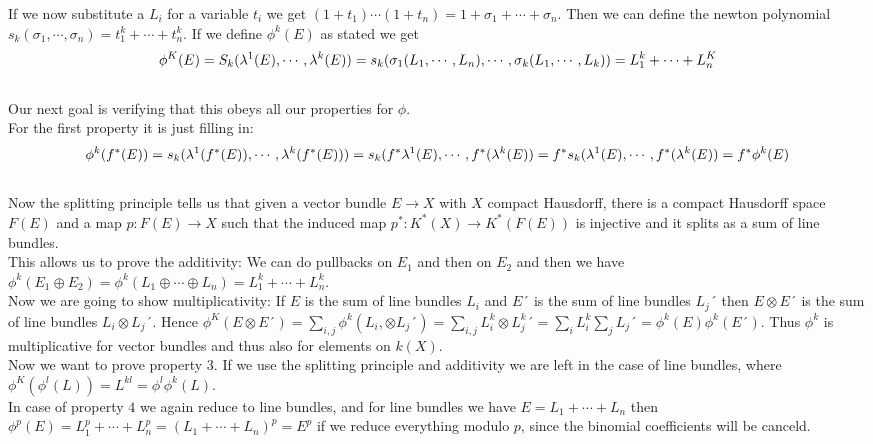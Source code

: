 \documentclass[../Thesis.tex]{subfiles}
\begin{document}
\begin{myproof}
If we now substitute a $L_i$ for a variable $t_i$ we get $(1 + t_1) \cdots ( 1 + t_n) = 1 + \sigma_1 + \cdots + \sigma_n$. Then we can define the newton polynomial $s_k(\sigma_1, \cdots, \sigma_n) = t_1^k + \cdots + t_n^k$. If we define $\phi^k(E)$ as stated we get
\begin{equation}
\phi^K(E) = S_k(\lambda^1(E), \cdots, \lambda^k(E)) \\
          = s_k(\sigma_1(L_1, \cdots, L_n), \cdots, \sigma_k(L_1, \cdots, L_k)) \\
          = L_1^k + \cdots + L_n^K
\end{equation}
\\Our next goal is verifying that this obeys all our properties for $\phi$.
\\For the first property it is just filling in:
\begin{equation}
\phi^k(f^*(E)) = s_k(\lambda^1(f^*(E)), \cdots, \lambda^k(f^* (E))) \\
               = s_k(f^*\lambda^1(E), \cdots, f^*(\lambda^k(E))\\
               = f^* s_k ( \lambda^1(E), \cdots, f^*(\lambda^k(E))\\
               = f^* \phi^k(E)               
\end{equation}
\\Now the splitting principle tells us that given a vector bundle $E \rightarrow X$ with $X$ compact Hausdorff, there is a compact Hausdorff space $F(E)$ and a map $p : F(E) \rightarrow X$ such that the induced map $p^*: K^*(X) \rightarrow K^*(F(E))$ is injective and it splits as a sum of line bundles.
\\This allows us to prove the additivity: We can do pullbacks on $E_1$ and then on $E_2$ and then we have $\phi^k(E_1 \oplus E_2) = \phi^k(L_1 \oplus \cdots \oplus L_n) = L_1^k + \cdots + L_n^k$.
\\Now we are going to show multiplicativity: If $E$ is the sum of line bundles $L_i$ and $E´$ is the sum of line bundles $L_j´$ then $E \otimes E´$ is the sum of line bundles $L_i \otimes L_j´$. Hence $\phi^K(E\otimes E´) = \sum_{i,j} \phi^k(L_i, \otimes L_j´ ) = \sum_{i,j} L_i^k \otimes L_j^k´ = \sum_i L_i^k \sum_jL_j´ = \phi^k(E) \phi^k(E´)$. Thus $\phi^k$ is multiplicative for vector bundles and thus also for elements on $k(X)$.
\\Now we want to prove property $3$. If we use the splitting principle and additivity we are left in the case of line bundles, where $\phi^K(\phi^l(L)) = L^{kl} = \phi^l\phi^k(L)$.
\\In case of property $4$ we again reduce to line bundles, and for line bundles we have $E = L_1 + \cdots + L_n$ then $\phi^p(E) = L_1^p + \cdots + L_n^p = (L_1 + \cdots + L_n)^p = E^p$ if we reduce everything modulo $p$, since the binomial coefficients will be canceld.
\end{myproof}
\end{document}

